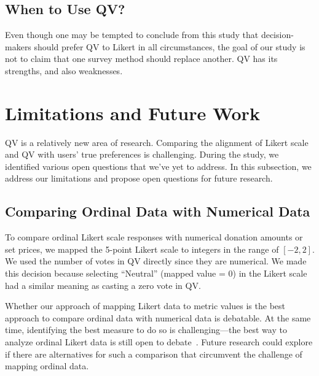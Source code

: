 \subsection{When to Use QV?}
Even though one may be tempted to conclude from this study that decision-makers should prefer QV to Likert in all circumstances, the goal of our study is not to claim that one survey method should replace another. QV has its strengths, and also weaknesses. 

{}

\section{Limitations and Future Work}
QV is a relatively new area of research. Comparing the alignment of Likert scale and QV with users' true preferences is challenging. During the study, we identified various open questions that we've yet to address. In this subsection, we address our limitations and propose open questions for future research. 

\subsection{Comparing Ordinal Data with Numerical Data}
To compare ordinal Likert scale responses with numerical donation amounts or set prices, we mapped the 5-point Likert scale to integers in the range of $[-2, 2]$. We used the number of votes in QV directly since they are numerical. We made this decision because selecting ``Neutral'' (mapped value = 0) in the Likert scale had a similar meaning as casting a zero vote in QV.

Whether our approach of mapping Likert data to metric values is the best approach to compare ordinal data with numerical data is debatable. At the same time, identifying the best measure to do so is challenging---the best way to analyze ordinal Likert data is still open to debate~\cite{gob2007ordinal}. Future research could explore if there are alternatives for such a comparison that circumvent the challenge of mapping ordinal data. 


